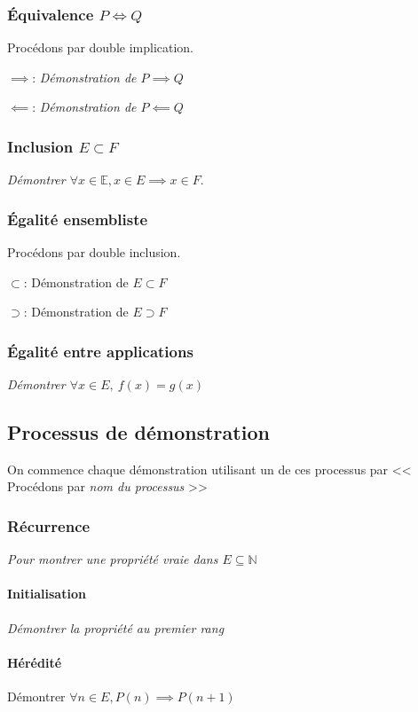 \documentclass{article}
\newcommand{\N}{{\mathbb N}}
\begin{document}
\subsubsection{Équivalence $P \iff Q$}
Procédons par double implication.

$\implies$: \emph{Démonstration de $P \implies Q$} 

$\impliedby$: \emph{Démonstration de $P \impliedby Q$} 

\subsubsection{Inclusion $E \subset F$}
\emph{Démontrer $\forall x \in \mathbb{E}, x \in E \implies x \in F$}.

\subsubsection{Égalité ensembliste}
Procédons par double inclusion.

$\subset$: Démonstration de $E \subset F$

$\supset$: Démonstration de $E \supset F$

\subsubsection{Égalité entre applications}
\emph{Démontrer $\forall x \in E,\ f(x) = g(x)$} 

\subsection{Processus de démonstration}
On commence chaque démonstration utilisant un de ces processus par << Procédons par \emph{nom du processus}  >> 

\subsubsection{Récurrence}
\emph{Pour montrer une propriété vraie dans $E \subseteq \N$} 

\paragraph{Initialisation}
\emph{Démontrer la propriété au premier rang} 

\paragraph{Hérédité}
Démontrer $\forall n \in E, P(n) \implies P(n+1)$
\end{document}
